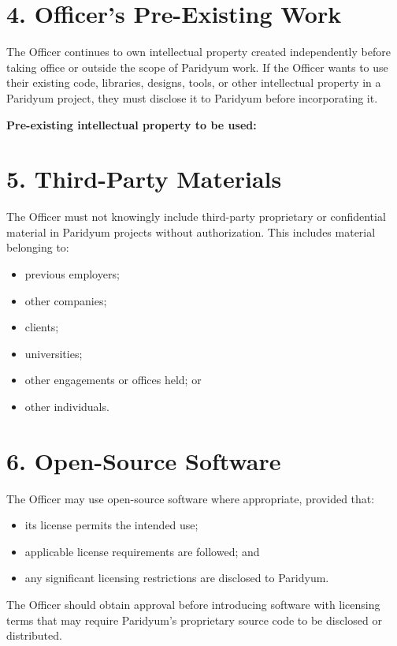 \documentclass{paridyum}
\begin{document}
\section*{4. Officer's Pre-Existing Work}
The Officer continues to own intellectual property created independently before taking
office or outside the scope of Paridyum work. If the Officer wants to use their
existing code, libraries, designs, tools, or other intellectual property in a Paridyum
project, they must disclose it to Paridyum before incorporating it.

\vspace{0.4em}
\textbf{Pre-existing intellectual property to be used:} \dkPPreExistingIp

\section*{5. Third-Party Materials}
The Officer must not knowingly include third-party proprietary or confidential material
in Paridyum projects without authorization. This includes material belonging to:
\begin{itemize}[leftmargin=*, noitemsep]
    \item previous employers;
    \item other companies;
    \item clients;
    \item universities;
    \item other engagements or offices held; or
    \item other individuals.
\end{itemize}

\section*{6. Open-Source Software}
The Officer may use open-source software where appropriate, provided that:
\begin{itemize}[leftmargin=*, noitemsep]
    \item its license permits the intended use;
    \item applicable license requirements are followed; and
    \item any significant licensing restrictions are disclosed to Paridyum.
\end{itemize}
The Officer should obtain approval before introducing software with licensing terms
that may require Paridyum's proprietary source code to be disclosed or distributed.
\end{document}
